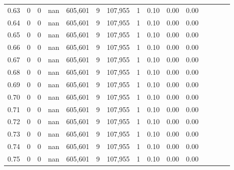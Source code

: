 \begin{tabular}{rrrcrrrrrrrrrrr}
0.63 &        0 &       0 &                                        nan &  605,601 &        9 &  107,955 &        1 &  0.10 &  0.00 &                         0.00 \\
0.64 &        0 &       0 &                                        nan &  605,601 &        9 &  107,955 &        1 &  0.10 &  0.00 &                         0.00 \\
0.65 &        0 &       0 &                                        nan &  605,601 &        9 &  107,955 &        1 &  0.10 &  0.00 &                         0.00 \\
0.66 &        0 &       0 &                                        nan &  605,601 &        9 &  107,955 &        1 &  0.10 &  0.00 &                         0.00 \\
0.67 &        0 &       0 &                                        nan &  605,601 &        9 &  107,955 &        1 &  0.10 &  0.00 &                         0.00 \\
0.68 &        0 &       0 &                                        nan &  605,601 &        9 &  107,955 &        1 &  0.10 &  0.00 &                         0.00 \\
0.69 &        0 &       0 &                                        nan &  605,601 &        9 &  107,955 &        1 &  0.10 &  0.00 &                         0.00 \\
0.70 &        0 &       0 &                                        nan &  605,601 &        9 &  107,955 &        1 &  0.10 &  0.00 &                         0.00 \\
0.71 &        0 &       0 &                                        nan &  605,601 &        9 &  107,955 &        1 &  0.10 &  0.00 &                         0.00 \\
0.72 &        0 &       0 &                                        nan &  605,601 &        9 &  107,955 &        1 &  0.10 &  0.00 &                         0.00 \\
0.73 &        0 &       0 &                                        nan &  605,601 &        9 &  107,955 &        1 &  0.10 &  0.00 &                         0.00 \\
0.74 &        0 &       0 &                                        nan &  605,601 &        9 &  107,955 &        1 &  0.10 &  0.00 &                         0.00 \\
0.75 &        0 &       0 &                                        nan &  605,601 &        9 &  107,955 &        1 &  0.10 &  0.00 &                         0.00 \\

\end{tabular}
